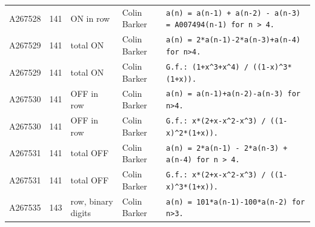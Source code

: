 \documentclass[11pt]{article}
\theoremstyle{definition}
\theoremstyle{remark}
\begin{document}
{\begin{longtable}{p{1.3cm}p{0.7cm}p{2.4cm}p{2.3cm}p{7.3cm}}
A267528 & 141 & ON in row & Colin Barker & \texttt{a(n)\allowbreak{} \allowbreak{}=\allowbreak{} \allowbreak{}a(n-\allowbreak{}1)\allowbreak{} \allowbreak{}+\allowbreak{} \allowbreak{}a(n-\allowbreak{}2)\allowbreak{} \allowbreak{}-\allowbreak{} \allowbreak{}a(n-\allowbreak{}3)\allowbreak{} \allowbreak{}=\allowbreak{} \allowbreak{}A007494(n-\allowbreak{}1)\allowbreak{} \allowbreak{}for \allowbreak{}n \allowbreak{}> \allowbreak{}4.} \\
A267529 & 141 & total ON & Colin Barker & \texttt{a(n)\allowbreak{} \allowbreak{}=\allowbreak{} \allowbreak{}2*\allowbreak{}a(n-\allowbreak{}1)\allowbreak{}-\allowbreak{}2*\allowbreak{}a(n-\allowbreak{}3)\allowbreak{}+\allowbreak{}a(n-\allowbreak{}4)\allowbreak{} \allowbreak{}for \allowbreak{}n>4.} \\
A267529 & 141 & total ON & Colin Barker & \texttt{G.f.: \allowbreak{}(1+\allowbreak{}x\^{}3+\allowbreak{}x\^{}4)\allowbreak{} \allowbreak{}/\allowbreak{} \allowbreak{}((1-\allowbreak{}x)\allowbreak{}\^{}3*\allowbreak{}(1+\allowbreak{}x)\allowbreak{})\allowbreak{}.} \\
A267530 & 141 & OFF in row & Colin Barker & \texttt{a(n)\allowbreak{} \allowbreak{}=\allowbreak{} \allowbreak{}a(n-\allowbreak{}1)\allowbreak{}+\allowbreak{}a(n-\allowbreak{}2)\allowbreak{}-\allowbreak{}a(n-\allowbreak{}3)\allowbreak{} \allowbreak{}for \allowbreak{}n>4.} \\
A267530 & 141 & OFF in row & Colin Barker & \texttt{G.f.: \allowbreak{}x*\allowbreak{}(2+\allowbreak{}x-\allowbreak{}x\^{}2-\allowbreak{}x\^{}3)\allowbreak{} \allowbreak{}/\allowbreak{} \allowbreak{}((1-\allowbreak{}x)\allowbreak{}\^{}2*\allowbreak{}(1+\allowbreak{}x)\allowbreak{})\allowbreak{}.} \\
A267531 & 141 & total OFF & Colin Barker & \texttt{a(n)\allowbreak{} \allowbreak{}=\allowbreak{} \allowbreak{}2*\allowbreak{}a(n-\allowbreak{}1)\allowbreak{} \allowbreak{}-\allowbreak{} \allowbreak{}2*\allowbreak{}a(n-\allowbreak{}3)\allowbreak{} \allowbreak{}+\allowbreak{} \allowbreak{}a(n-\allowbreak{}4)\allowbreak{} \allowbreak{}for \allowbreak{}n \allowbreak{}> \allowbreak{}4.} \\
A267531 & 141 & total OFF & Colin Barker & \texttt{G.f.: \allowbreak{}x*\allowbreak{}(2+\allowbreak{}x-\allowbreak{}x\^{}2-\allowbreak{}x\^{}3)\allowbreak{} \allowbreak{}/\allowbreak{} \allowbreak{}((1-\allowbreak{}x)\allowbreak{}\^{}3*\allowbreak{}(1+\allowbreak{}x)\allowbreak{})\allowbreak{}.} \\
A267535 & 143 & row, binary digits & Colin Barker & \texttt{a(n)\allowbreak{} \allowbreak{}=\allowbreak{} \allowbreak{}101*\allowbreak{}a(n-\allowbreak{}1)\allowbreak{}-\allowbreak{}100*\allowbreak{}a(n-\allowbreak{}2)\allowbreak{} \allowbreak{}for \allowbreak{}n>3.} \\

\end{longtable}}
\end{document}
